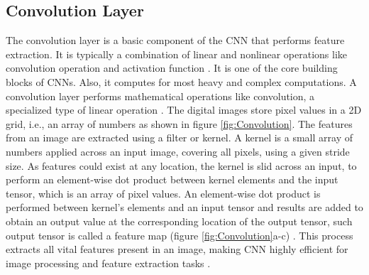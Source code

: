 \subsection{Convolution Layer}
The convolution layer is a basic component of the \ac{CNN} that performs feature extraction. It is typically a combination of linear and nonlinear operations like convolution operation and activation function \cite{articleCNNs}. It is one of the core building blocks of \acp{CNN}. Also, it computes for most heavy and complex computations. A convolution layer performs mathematical operations like convolution, a specialized type of linear operation \cite{articleCNNs}. The digital images store pixel values in a \ac{2D} grid, i.e., an array of numbers as shown in figure \ref{fig:Convolution}. The features from an image are extracted using a filter or kernel. A kernel is a small array of numbers applied across an input image, covering all pixels, using a given stride size. As features could exist at any location, the kernel is slid across an input, to perform an element-wise dot product between kernel elements and the input tensor, which is an array of pixel values. An element-wise dot product is performed between kernel's elements and an input tensor and results are added to obtain an output value at the corresponding location of the output tensor, such output tensor is called a feature map (figure \ref{fig:Convolution}a-c) \cite{articleCNNs}. This process extracts all vital features present in an image, making \ac{CNN} highly efficient for image processing and feature extraction tasks \cite{articleCNNs}.



